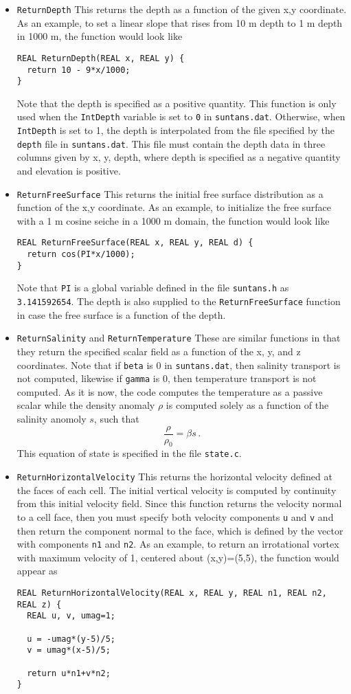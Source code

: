 \begin{itemize}
\item \verb+ReturnDepth+ This returns the depth as a function of the given x,y coordinate. 
As an example, to set a linear slope that rises from 10 m depth to 1 m depth in 1000 m, the
function would look like
\begin{verbatim}
REAL ReturnDepth(REAL x, REAL y) {
  return 10 - 9*x/1000;
}
\end{verbatim}
Note that the depth is specified as a positive quantity.  This function is only used when the \verb+IntDepth+ variable is
set to \verb+0+ in \verb+suntans.dat+.  Otherwise, when \verb+IntDepth+ is set to 1, 
the depth is interpolated from the file specified by the \verb+depth+
file in \verb+suntans.dat+.  This file must contain the depth data in three columns given by x, y, depth, where depth
is specified as a negative quantity and elevation is positive.
\item \verb+ReturnFreeSurface+ This returns the initial free surface distribution as a function of the x,y coordinate.
As an example, to initialize the free surface with a 1 m cosine seiche in a 1000 m domain, the function would look like
\begin{verbatim}
REAL ReturnFreeSurface(REAL x, REAL y, REAL d) {
  return cos(PI*x/1000);
}
\end{verbatim}
Note that \verb+PI+ is a global variable defined in the file \verb+suntans.h+ as \verb+3.141592654+.  The depth
is also supplied to the \verb+ReturnFreeSurface+ function in case the free surface is a function of the depth.
\item \verb+ReturnSalinity+ and \verb+ReturnTemperature+  These are similar functions in that they return the
specified scalar field as a function of the x, y, and z coordinates.  Note that if \verb+beta+ is 0 in \verb+suntans.dat+,
then salinity transport is not computed, likewise if \verb+gamma+ is 0, then temperature transport is not computed.  
As it is now, the code computes the temperature as a passive scalar while the density anomaly $\rho$ is computed solely as a function of the salinity anomoly $s$, such that
\[\frac{\rho}{\rho_0}=\beta s\,.\]  This equation of state is specified in the file \verb+state.c+.
\item \verb+ReturnHorizontalVelocity+ This returns the horizontal velocity defined at the faces of each cell.  The initial vertical velocity is
computed by continuity from this initial velocity field.  Since this function returns the velocity normal to a cell face, then
you must specify both velocity components \verb+u+ and \verb+v+ and then return the component normal to the face, which is
defined by the vector with components \verb+n1+ and \verb+n2+.  As an example, to return an irrotational vortex with
maximum velocity of 1, centered
about (x,y)=(5,5), the function would appear as
\begin{verbatim}
REAL ReturnHorizontalVelocity(REAL x, REAL y, REAL n1, REAL n2, REAL z) {
  REAL u, v, umag=1;

  u = -umag*(y-5)/5;
  v = umag*(x-5)/5;

  return u*n1+v*n2;
}
\end{verbatim}
\end{itemize}

